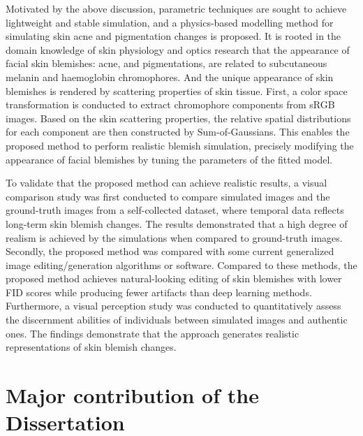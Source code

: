 \begin{spacing}{1.5}
Motivated by the above discussion, parametric techniques are sought to achieve lightweight and stable simulation, and a physics-based modelling method for simulating skin acne and pigmentation changes is proposed. It is rooted in the domain knowledge of skin physiology and optics research that the appearance of facial skin blemishes: acne, and pigmentations, are related to subcutaneous melanin and haemoglobin chromophores\cite{tsumuraImagebasedSkinColor}. And the unique appearance of skin blemishes is rendered by scattering properties of skin tissue\cite{10.5555/2383894.2383946}. First, a color space transformation is conducted to extract chromophore components from sRGB images. Based on the skin scattering properties, the relative spatial distributions for each component are then constructed by Sum-of-Gaussians. This enables the proposed method to perform realistic blemish simulation, precisely modifying the appearance of facial blemishes by tuning the parameters of the fitted model.

To validate that the proposed method can achieve realistic results, a visual comparison study was first conducted to compare simulated images and the ground-truth images from a self-collected dataset, where temporal data reflects long-term skin blemish changes. The results demonstrated that a high degree of realism is achieved by the simulations when compared to ground-truth images. Secondly, the proposed method was compared with some current generalized image editing/generation algorithms or software. Compared to these methods, the proposed method achieves natural-looking editing of skin blemishes with lower FID scores while producing fewer artifacts than deep learning methods. Furthermore, a visual perception study was conducted to quantitatively assess the discernment abilities of individuals between simulated images and authentic ones. The findings demonstrate that the approach generates realistic representations of skin blemish changes.


\section{Major contribution of the Dissertation}


\end{spacing}
